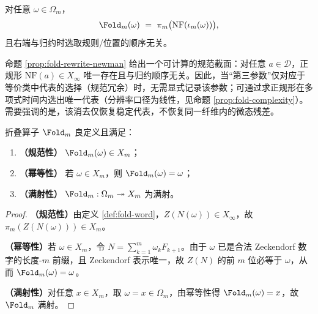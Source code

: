 \begin{corollary}\label{cor:foldm-order-indep}
对任意 $\omega\in\Omega_m$，
\[
\Fold_m(\omega)\ =\ \pi_m\bigl(\mathrm{NF}(\iota_m(\omega))\bigr),
\]
且右端与归约时选取规则/位置的顺序无关。
\end{corollary}

\begin{remark}[规范截面与可计算性]\label{rem:fold-normal-form-computable-section}
命题 \ref{prop:fold-rewrite-newman} 给出一个可计算的规范截面：对任意 $a\in\mathcal{D}$，正规形 $\mathrm{NF}(a)\in X_\infty$ 唯一存在且与归约顺序无关。因此，当“第三参数”仅对应于等价类中代表的选择（规范冗余）时，无需显式记录该参数；可通过求正规形在多项式时间内选出唯一代表（分辨率口径为线性，见命题 \ref{prop:fold-complexity}）。需要强调的是，该消去仅恢复稳定代表，不恢复同一纤维内的微态残差。
\end{remark}

\begin{proposition}\label{prop:fold-basic}
折叠算子 $\Fold_m$ 良定义且满足：
\begin{enumerate}
\normalfont
  \item \textbf{（规范性）} $\Fold_m(\omega)\in X_m$；
  \item \textbf{（幂等性）} 若 $\omega\in X_m$，则 $\Fold_m(\omega)=\omega$；
  \item \textbf{（满射性）} $\Fold_m:\Omega_m\twoheadrightarrow X_m$ 为满射。
\end{enumerate}
\end{proposition}

\begin{proof}
\textbf{（规范性）}由定义 \ref{def:fold-word}，$Z(N(\omega))\in X_\infty$，故 $\pi_m(Z(N(\omega)))\in X_m$。

\textbf{（幂等性）}若 $\omega\in X_m$，令 $N=\sum_{k=1}^m \omega_k F_{k+1}$。由于 $\omega$ 已是合法 Zeckendorf 数字的长度-$m$ 前缀，且 Zeckendorf 表示唯一，故 $Z(N)$ 的前 $m$ 位必等于 $\omega$，从而 $\Fold_m(\omega)=\omega$。

\textbf{（满射性）}对任意 $x\in X_m$，取 $\omega=x\in\Omega_m$，由幂等性得 $\Fold_m(\omega)=x$，故 $\Fold_m$ 满射。
\end{proof}
